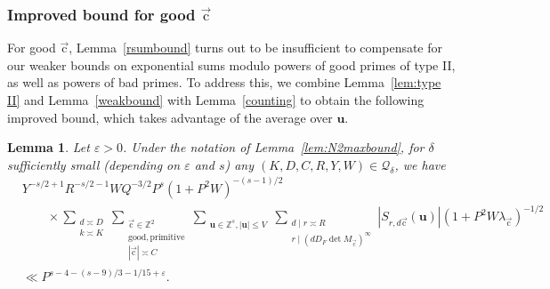 \documentclass[letterpaper,11pt]{amsart}
\numberwithin{equation}{section}
\newtheorem{lemma}[theorem]{Lemma}
\theoremstyle{definition}
\numberwithin{equation}{section}
\newcommand{\ZZ}{\mathbb{Z}}
\newcommand{\uu}{\mathbf{u}}
\newcommand{\uc}{{\vec{\mathrm{c}}}}
\newcommand{\ve}{\varepsilon}
\begin{document}
\subsubsection{Improved bound for good $\uc$}

For good $\uc$, Lemma~\ref{rsumbound} turns out to be insufficient to compensate for our weaker bounds on exponential sums modulo powers of good primes of type II, as well as powers of bad primes. To address this, we combine Lemma~\ref{lem:type II} and Lemma~\ref{weakbound} with Lemma~\ref{counting} to obtain the following improved bound, which takes advantage of the average over $\uu$.
\begin{lemma}\label{cursum}
Let $\ve>0$. Under the notation of Lemma~\ref{lem:N2maxbound}, for $\delta$ sufficiently small (depending on $\ve$ and $s$) any $(K, D,C,R, Y, W)\in \mathcal Q_\delta$, we have  \begin{equation*}
\begin{split}
&Y^{-s/2+1}R^{-s/2-1}WQ^{-3/2}P^{s} (1+P^2W)^{-(s-1)/2}\\
 &\qquad\times \sum_{\substack{d\asymp D\\ k\asymp K}}\sum_{\substack{\uc\in \ZZ^2\\ \mathrm{good, primitive} \\|\uc|\asymp C}}\sum_{\substack{\uu\in \ZZ^s, |\uu|\leq V}}\sum_{\substack{d\mid r\asymp R\\  r\mid (dD_F\det M_\uc)^\infty}}|S_{r, d\uc}(\uu)| (1+P^2W\lambda_\uc)^{-1/2} \\
&\ll P^{s-4-(s-9)/3-1/15+\ve}.
\end{split}
\end{equation*}
\end{lemma}
\end{document}
